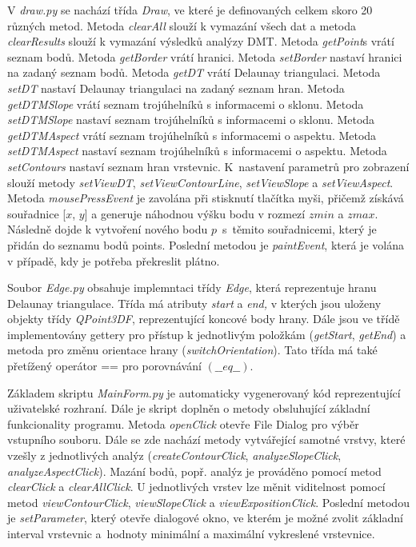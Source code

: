 \documentclass{article}
\begin{document}
\begin{spacing}{1.5}
V \textit{draw.py} se nachází třída \textit{Draw}, ve které je definovaných celkem skoro 20 různých metod. Metoda \textit{clearAll} slouží k vymazání všech dat a metoda \textit{clearResults} slouží k vymazání výsledků analýzy DMT. Metoda \textit{getPoint}s vrátí seznam bodů. Metoda \textit{getBorder} vrátí hranici. Metoda \textit{setBorder} nastaví hranici na zadaný seznam bodů. Metoda \textit{getDT} vrátí Delaunay triangulaci. Metoda \textit{setDT} nastaví Delaunay triangulaci na zadaný seznam hran. Metoda \textit{getDTMSlope} vrátí seznam trojúhelníků s informacemi o sklonu. Metoda \textit{setDTMSlope} nastaví seznam trojúhelníků s informacemi o sklonu. Metoda \textit{getDTMAspect} vrátí seznam trojúhelníků s informacemi o aspektu. Metoda \textit{setDTMAspect} nastaví seznam trojúhelníků s informacemi o aspektu. Metoda \textit{setContours} nastaví seznam hran vrstevnic. K~nastavení parametrů pro zobrazení slouží metody \textit{setViewDT}, \textit{setViewContourLine}, \textit{setViewSlope} a \textit{setViewAspect}. Metoda \textit{mousePressEvent} je zavolána při stisknutí tlačítka myši, přičemž získává souřadnice [$x$, $y$] a generuje náhodnou výšku bodu v rozmezí $zmin$ a $zmax$. Následně dojde k vytvoření nového bodu $p$~s~těmito souřadnicemi, který je přidán do seznamu bodů points. Poslední metodou je \textit{paintEvent}, která je volána v případě, kdy je potřeba překreslit plátno. 

Soubor \textit{Edge.py} obsahuje implemntaci třídy \textit{Edge}, která reprezentuje hranu Delaunay triangulace. Třída má atributy \textit{start} a \textit{end,} v kterých jsou uloženy objekty třídy \textit{QPoint3DF}, reprezentující koncové body hrany. Dále jsou ve třídě implementovány gettery pro přístup k jednotlivým položkám (\textit{getStart}, \textit{getEnd}) a metoda pro změnu orientace hrany (\textit{switchOrientation}). Tato třída má také přetížený operátor == pro porovnávání $(\_\_eq\_\_)$. 

Základem skriptu \textit{MainForm.py} je automaticky vygenerovaný kód reprezentující uživatelské rozhraní. Dále je skript doplněn o metody obsluhující základní funkcionality programu. Metoda \textit{openClick} otevře File Dialog pro výběr vstupního souboru. Dále se zde nachází metody vytvářející samotné vrstvy, které vzešly z jednotlivých analýz (\textit{createContourClick}, \textit{analyzeSlopeClick}, \textit{analyzeAspectClick}). Mazání bodů, popř. analýz je prováděno pomocí metod \textit{clearClick} a \textit{clearAllClick}. U jednotlivých vrstev lze měnit viditelnost pomocí metod \textit{viewContourClick}, \textit{viewSlopeClick} a  \textit{viewExpositionClick}. Poslední metodou je \textit{setParameter}, který otevře dialogové okno, ve kterém je možné zvolit základní interval vrstevnic a~hodnoty minimální a maximální vykreslené vrstevnice. 


\end{spacing}
\end{document}
